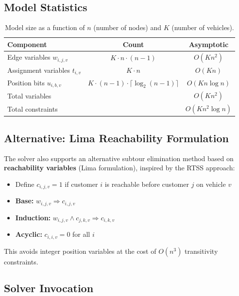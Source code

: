 \documentclass[12pt,a4paper]{article}
\theoremstyle{definition}
\begin{document}
\subsection{Model Statistics}

\begin{table}[H]
\centering
\begin{tabular}{lcc}
\toprule
\textbf{Component} & \textbf{Count} & \textbf{Asymptotic} \\
\midrule
Edge variables $w_{i,j,v}$ & $K \cdot n \cdot (n-1)$ & $O(K n^2)$ \\
Assignment variables $t_{i,v}$ & $K \cdot n$ & $O(Kn)$ \\
Position bits $u_{i,b,v}$ & $K \cdot (n-1) \cdot \lceil \log_2(n-1) \rceil$ & $O(Kn \log n)$ \\
\midrule
Total variables & & $O(Kn^2)$ \\
Total constraints & & $O(Kn^2 \log n)$ \\
\bottomrule
\end{tabular}
\caption{Model size as a function of $n$ (number of nodes) and $K$ (number of vehicles).}
\end{table}

\subsection{Alternative: Lima Reachability Formulation}

The solver also supports an alternative subtour elimination method based on \textbf{reachability variables} (Lima formulation), inspired by the RTSS approach:

\begin{itemize}
    \item Define $c_{i,j,v} = 1$ if customer $i$ is reachable before customer $j$ on vehicle $v$
    \item \textbf{Base:} $w_{i,j,v} \Rightarrow c_{i,j,v}$
    \item \textbf{Induction:} $w_{i,j,v} \wedge c_{j,k,v} \Rightarrow c_{i,k,v}$
    \item \textbf{Acyclic:} $c_{i,i,v} = 0$ for all $i$
\end{itemize}

This avoids integer position variables at the cost of $O(n^3)$ transitivity constraints.

\subsection{Solver Invocation}
\end{document}
